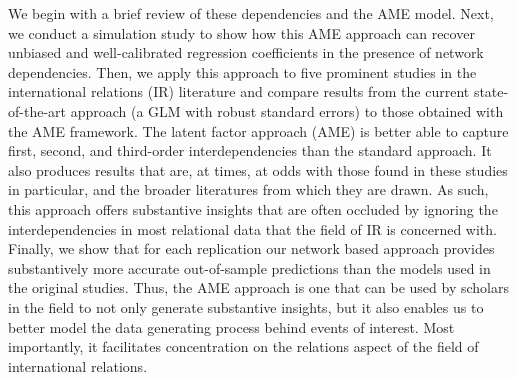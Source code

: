 We begin with a brief review of these dependencies and the AME model. Next, we conduct a simulation study to show how this AME approach can recover unbiased and well-calibrated regression coefficients in the presence of network dependencies. Then, we apply this approach to five prominent studies in the international relations (IR) literature and compare results from the current state-of-the-art approach (a GLM with robust standard errors) to those obtained with the AME framework. The latent factor approach (AME) is better able to capture first, second, and third-order interdependencies than the standard approach. It also produces results that are, at times, at odds with those found in these studies in particular, and the broader literatures from which they are drawn. As such, this approach offers substantive insights that are often occluded by ignoring the interdependencies in most relational data that the field of IR is concerned with. Finally, we show that for each replication our network based approach provides substantively more accurate out-of-sample predictions than the models used in the original studies. Thus, the AME approach is one that can be used by scholars in the field to not only generate substantive insights, but it also enables us to better model the data generating process behind events of interest.  Most importantly, it facilitates concentration on the relations aspect of the field of international relations.